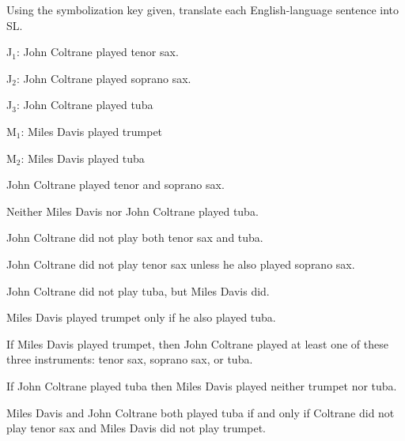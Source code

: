 
\noindent\problempart Using the symbolization key given, translate each English-language sentence into SL.
\label{pr.jazzinstruments}
\begin{ekey}
\item[J$_1$:] John Coltrane played tenor sax.
\item[J$_2$:] John Coltrane played soprano sax.
\item[J$_3$:] John Coltrane played tuba
\item[M$_1$:] Miles Davis played trumpet
\item[M$_2$:]Miles Davis played tuba
\end{ekey}

\begin{exercises}
\item John Coltrane played tenor and soprano sax. %
\item Neither Miles Davis nor John Coltrane played tuba. %
\item John Coltrane did not play both tenor sax and tuba.  %
\item John Coltrane did not play tenor sax unless he also played soprano sax. %
\item John Coltrane did not play tuba, but Miles Davis did. %
\item Miles Davis played trumpet only if he also played tuba. %
\item If Miles Davis played trumpet, then John Coltrane played at least one of these three instruments: tenor sax, soprano sax, or tuba. %
\item If John Coltrane played tuba then Miles Davis played neither trumpet nor tuba. %
\item Miles Davis and John Coltrane both played tuba if and only if Coltrane did not play tenor sax and Miles Davis did not play trumpet. %
\end{exercises}


